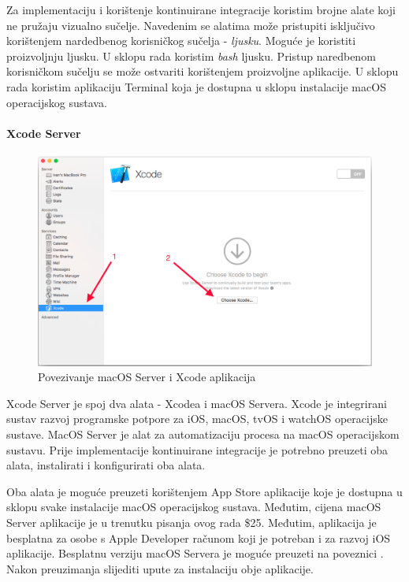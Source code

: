 \documentclass[times, utf8, diplomski, numeric]{fer}
\begin{document}
\begin{appendices}
Za implementaciju i korištenje kontinuirane integracije koristim brojne alate koji ne pružaju vizualno sučelje. Navedenim se alatima može pristupiti isključivo korištenjem nardedbenog korisničkog sučelja - \textit{ljusku}. Moguće je koristiti proizvoljnju ljusku. U sklopu rada koristim \textit{bash} ljusku. Pristup naredbenom korisničkom sučelju se može ostvariti korištenjem proizvoljne aplikacije. U sklopu rada koristim aplikaciju Terminal koja je dostupna u sklopu instalacije macOS operacijskog sustava.

\paragraph{Xcode Server}

\begin{figure}
\centering
\includegraphics[scale=0.35]{XcodeServerSetup1}
\caption{Povezivanje macOS Server i Xcode aplikacija}
\label{fig:XcodeServerSetup1}
\end{figure}

Xcode Server je spoj dva alata - Xcodea i macOS Servera. Xcode je integrirani sustav razvoj programske potpore za iOS, macOS, tvOS i watchOS operacijske sustave. MacOS Server je alat za automatizaciju procesa na macOS operacijskom sustavu. Prije implementacije kontinuirane integracije je potrebno preuzeti oba alata, instalirati i konfigurirati oba alata.

Oba alata je moguće preuzeti korištenjem App Store aplikacije koje je dostupna u sklopu svake instalacije macOS operacijskog sustava. Međutim, cijena macOS Server aplikacije je u trenutku pisanja ovog rada \$25. Međutim, aplikacija je besplatna za osobe s Apple Developer računom koji je potreban i za razvoj iOS aplikacije. Besplatnu verziju macOS Servera je moguće preuzeti na poveznici . Nakon preuzimanja slijediti upute za instalaciju obje aplikacije.


\end{appendices}
\end{document}
